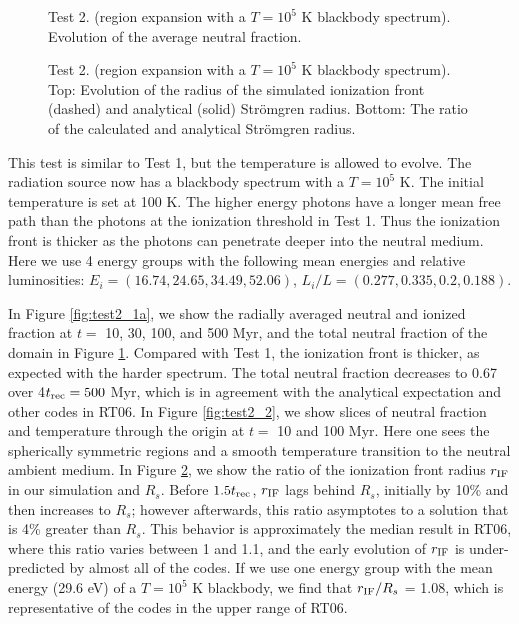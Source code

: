 \documentclass[useAMS,usenatbib,a4paper]{mn2e}
\begin{document}
\begin{figure}
  \caption{\label{fig:test2_1b} Test 2. (\hii region expansion with a
    $T=10^5$ K blackbody spectrum).  Evolution of the average neutral
    fraction.}
\end{figure}

\begin{figure*}
  \caption{\label{fig:test2_2} Test 2. (\hii region expansion
    with a $T=10^5$ K blackbody spectrum).  Top: Slices through the
    origin of neutral fraction at 10 and 100 Myr.  Bottom: Slices of
    temperature at 10 and 100 Myr.}
\end{figure*}

\begin{figure}
  \caption{\label{fig:test2_3} Test 2. (\hii region expansion
    with a $T=10^5$ K blackbody spectrum).  Top: Evolution of the
    radius of the simulated ionization front (dashed) and analytical
    (solid) Str\"{o}mgren radius.  Bottom: The ratio of the calculated
    and analytical Str\"{o}mgren radius.}
\end{figure}

This test is similar to Test 1, but the temperature is allowed to
evolve.  The radiation source now has a blackbody spectrum with a $T =
10^5$ K.  The initial temperature is set at 100 K.  The higher energy
photons have a longer mean free path than the photons at the
ionization threshold in Test 1.  Thus the ionization front is thicker
as the photons can penetrate deeper into the neutral medium.  Here we
use 4 energy groups with the following mean energies and relative
luminosities: $E_i = (16.74, 24.65, 34.49, 52.06)$, $L_i/L = (0.277,
0.335, 0.2, 0.188)$.

In Figure \ref{fig:test2_1a}, we show the radially averaged neutral
and ionized fraction at $t = $ 10, 30, 100, and 500 Myr, and the total
neutral fraction of the domain in Figure \ref{fig:test2_1b}.  Compared
with Test 1, the ionization front is thicker, as expected with the
harder spectrum.  The total neutral fraction decreases to 0.67 over
4$t_{\rm rec} = 500$ Myr, which is in agreement with the analytical
expectation and other codes in RT06.  In Figure \ref{fig:test2_2}, we
show slices of neutral fraction and temperature through the origin at
$t = $ 10 and 100 Myr.  Here one sees the spherically symmetric \hii
regions and a smooth temperature transition to the neutral ambient
medium.  In Figure \ref{fig:test2_3}, we show the ratio of the
ionization front radius $r_{\rm IF}$ in our simulation and $R_s$.
Before $1.5t_{\rm rec}$, $r_{\rm IF}$ lags behind $R_s$, initially by
10\% and then increases to $R_s$; however afterwards, this ratio
asymptotes to a solution that is 4\% greater than $R_s$.  This
behavior is approximately the median result in RT06, where this ratio
varies between 1 and 1.1, and the early evolution of $r_{\rm IF}$ is
under-predicted by almost all of the codes.  If we use one energy
group with the mean energy (29.6 eV) of a $T=10^5$ K blackbody, we
find that $r_{\rm IF}/R_s$ = 1.08, which is representative of the
codes in the upper range of RT06.
\end{document}
